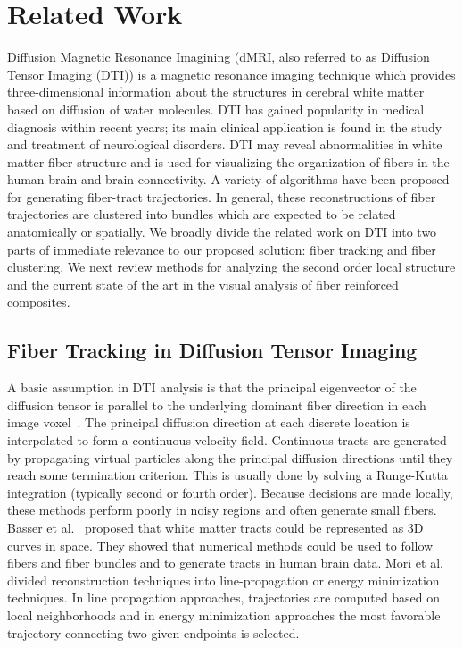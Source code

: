 \section{Related Work}
Diffusion Magnetic Resonance Imagining (dMRI, also referred to as Diffusion Tensor Imaging (DTI)) is a magnetic resonance imaging technique which provides three-dimensional information about the structures in cerebral white matter based on diffusion of water molecules. DTI has gained popularity in medical diagnosis within recent years; its main clinical application is found in the study and treatment of neurological disorders. DTI may reveal abnormalities in white matter fiber structure and is used for visualizing the organization of fibers in the human brain and brain connectivity.
A variety of algorithms have been proposed for generating fiber-tract trajectories. In general, these reconstructions of fiber trajectories are clustered into bundles which are expected to be related anatomically or spatially. 
We broadly divide the related work on DTI into two parts of immediate relevance to our proposed solution: fiber tracking and fiber clustering. We next review methods for analyzing the second order local structure and the current state of the art in the visual analysis of fiber reinforced composites.
\subsection {Fiber Tracking in Diffusion Tensor Imaging}
\label{subsec:fiberEx} 
A basic assumption in DTI analysis is that the principal eigenvector of the diffusion tensor is parallel to the underlying dominant fiber direction in each image voxel~\cite{Basser2002, Mori1999, Mori2002}. The principal diffusion direction at each discrete location is interpolated to form a continuous velocity field. Continuous tracts are generated by propagating virtual particles along the principal diffusion directions until they reach some termination criterion. 
This is usually done by solving a Runge-Kutta integration (typically second or fourth order).
Because decisions are made locally, these methods perform poorly in noisy regions and often generate small fibers. Basser et al.~\cite{Basser2002,Basser2000} proposed that white matter tracts could be represented as 3D curves in space. They showed that numerical methods could be used to follow fibers and fiber bundles and to generate tracts in human brain data. 
Mori et al.~\cite{Mori1999,Mori2002} divided reconstruction techniques into line-propagation or energy minimization techniques. In line propagation approaches, trajectories are computed based on local neighborhoods and in energy minimization approaches the most favorable trajectory connecting two given endpoints is selected. 


